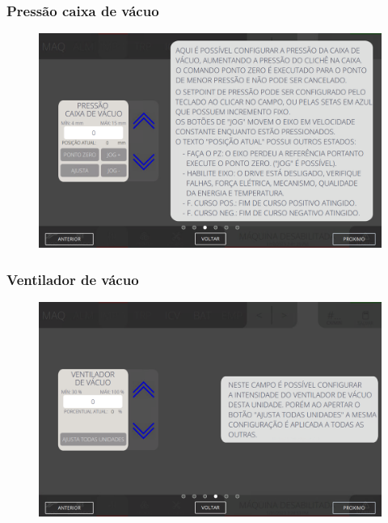 \newpage
\thispagestyle{fancy}
\vspace*{\fill}
\subsubsection{\small{Pressão caixa de vácuo}} \label{sec:telaAjustesImpressoraPressaoCaixaVaco}
\vspace*{\fill}
\begin{figure}[h]
    \centering
    \includegraphics[width=576 px,height=360 px]{src/imagesICV/04-printters/02-printter/settings/e-3.png}
\end{figure}
\vspace*{\fill}

\newpage
\thispagestyle{fancy}
\vspace*{\fill}
\subsubsection{\small{Ventilador de vácuo}} \label{sec:telaAjustesImpressoraVentiladorVaco}
\vspace*{\fill}
\begin{figure}[h]
    \centering
    \includegraphics[width=576 px,height=360 px]{src/imagesICV/04-printters/02-printter/settings/e-4.png}
\end{figure}
\vspace*{\fill}

